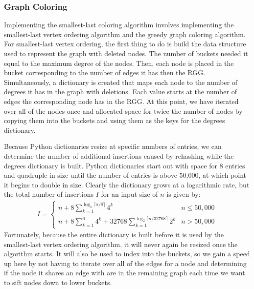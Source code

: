 \documentclass{article}
\begin{document}
        \subsubsection{Graph Coloring}
        Implementing the smallest-last coloring algorithm involves implementing the smallest-last vertex ordering algorithm and the greedy graph coloring algorithm. For smallest-last vertex ordering, the first thing to do is build the data structure used to represent the graph with deleted nodes. The number of buckets needed it equal to the maximum degree of the nodes. Then, each node is placed in the bucket corresponding to the number of edges it has then the RGG. Simultaneously, a dictionary is created that maps each node to the number of degrees it has in the graph with deletions. Each value starts at the number of edges the corresponding node has in the RGG. At this point, we have iterated over all of the nodes once and allocated space for twice the number of nodes by copying them into the buckets and using them as the keys for the degrees dictionary.
        \par
        Because Python dictionaries resize at specific numbers of entries, we can determine the number of additional insertions caused by rehashing while the degrees dictionary is built. Python dictionaries start out with space for 8 entries and quadruple in size until the number of entries is above 50,000, at which point it begins to double in size. Clearly the dictionary grows at a logarithmic rate, but the total number of insertions $I$ for an input size of $n$ is given by:
        \begin{align}
            I =
            \begin{cases}
                n + 8\sum_{k=1}^{\log_4\lceil n/8\rceil}4^k & n \leq 50,000 \\
                n + 8\sum_{k=1}^{6}4^k + 32768\sum_{k=1}^{\log_2\lceil n/32768\rceil}2^k & n > 50,000
            \end{cases}
        \end{align}
        Fortunately, because the entire dictionary is built before it is used by the smallest-last vertex ordering algorithm, it will never again be resized once the algorithm starts. It will also be used to index into the buckets, so we gain a speed up here by not having to iterate over all of the edges for a node and determining if the node it shares an edge with are in the remaining graph each time we want to sift nodes down to lower buckets.
        \par
\end{document}
